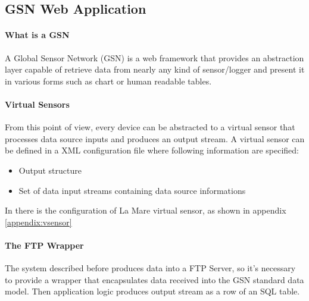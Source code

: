 \subsection{GSN Web Application }
\paragraph{What is a GSN \cite{cll1}}
A Global Sensor Network (GSN) is a web framework that provides an abstraction layer capable of retrieve data from nearly any kind of sensor/logger and present it in various forms such as chart or human readable tables.
\paragraph{Virtual Sensors}
From this point of view, every device can be abstracted to a virtual sensor that processes data source inputs and produces an output stream. A virtual sensor can be defined in a XML configuration file where following information are specified:
\begin{itemize}
	\item Output structure
	\item Set of data input streams containing data source informations
\end{itemize}
In \cite{cll1} there is the configuration of La Mare virtual sensor, as shown in appendix \ref{appendix:vsensor}
\paragraph{The FTP Wrapper}
The system described before produces data into a FTP Server, so it's necessary to provide a wrapper that encapsulates data received into the GSN standard data model. Then application logic produces output stream as a row of an SQL table.